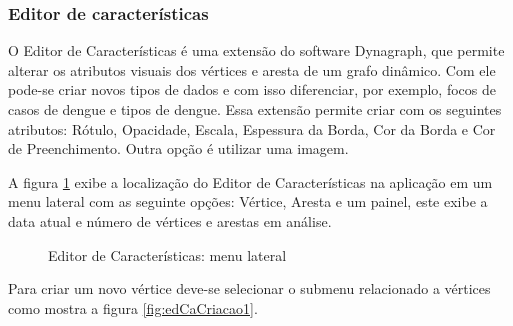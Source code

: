 \subsubsection{Editor de características}
O Editor de Características é uma extensão do software Dynagraph, que permite alterar os atributos visuais dos vértices e aresta de um grafo dinâmico.
Com ele pode-se criar novos tipos de dados e com isso diferenciar, por exemplo, focos de casos de dengue e tipos de dengue.
Essa extensão permite criar com os seguintes atributos: Rótulo, Opacidade, Escala, Espessura da Borda, Cor da Borda e Cor de Preenchimento. Outra opção é utilizar uma imagem.
 
A figura \ref{fig:edCaMenu} exibe a localização do Editor de Características na aplicação em um menu lateral com as seguinte opções: Vértice, Aresta e um painel, este exibe a data atual e número de vértices e arestas em análise.
\begin{figure}[!ht]
	\centering	
	\caption{\label{fig:edCaMenu} Editor de Características: menu lateral}
\end{figure}
\FloatBarrier

Para criar um novo vértice deve-se selecionar o submenu relacionado a vértices como mostra a figura \ref{fig:edCaCriacao1}.
\begin{figure}[!ht]
	\centering	
\end{figure}
\FloatBarrier

